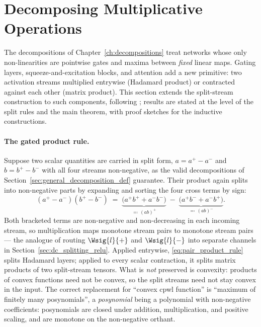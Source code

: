 \section{Decomposing Multiplicative Operations}\label{sec:multiplicative_splits}

The decompositions of Chapter~\ref{ch:decompositions} treat networks whose only non-linearities are pointwise gates and maxima between \emph{fixed} linear maps. Gating layers, squeeze-and-excitation blocks, and attention add a new primitive: two activation streams multiplied entrywise (Hadamard product) or contracted against each other (matrix product). This section extends the split-stream construction to such components, following \textcite{hiddenMono}; results are stated at the level of the split rules and the main theorem, with proof sketches for the inductive constructions.

\paragraph{The gated product rule.}
Suppose two scalar quantities are carried in split form, $a = a^{+} - a^{-}$ and $b = b^{+} - b^{-}$ with all four streams non-negative, as the valid decompositions of Section~\ref{sec:general_decomposition_def} guarantee. Their product again splits into non-negative parts by expanding and sorting the four cross terms by sign:
\begin{equation}
	(a^{+} - a^{-})(b^{+} - b^{-})
	\;=\;
	\underbrace{\bigl(a^{+}b^{+} + a^{-}b^{-}\bigr)}_{\eqqcolon\, (ab)^{+}}
	\;-\;
	\underbrace{\bigl(a^{+}b^{-} + a^{-}b^{+}\bigr)}_{\eqqcolon\, (ab)^{-}}.
	\label{eq:pair_product_rule}
\end{equation}
Both bracketed terms are non-negative and non-decreasing in each incoming stream, so multiplication maps monotone stream pairs to monotone stream pairs --- the analogue of routing $\Wsig{l}{+}$ and $\Wsig{l}{-}$ into separate channels in Section~\ref{sec:dc_splitting_relu}. Applied entrywise, \eqref{eq:pair_product_rule} splits Hadamard layers; applied to every scalar contraction, it splits matrix products of two split-stream tensors. What is \emph{not} preserved is convexity: products of convex functions need not be convex, so the split streams need not stay convex in the input. The correct replacement for ``convex \ac{cpwl} function'' is ``maximum of finitely many posynomials'', a \emph{posynomial} being a polynomial with non-negative coefficients: posynomials are closed under addition, multiplication, and positive scaling, and are monotone on the non-negative orthant.

